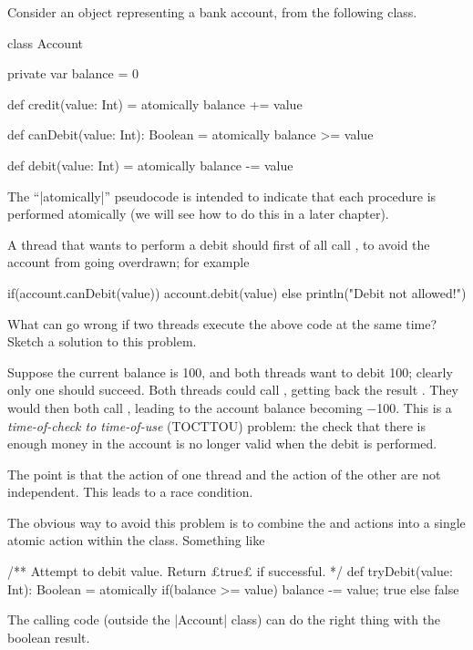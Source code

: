 \begin{questionS}
\label{exercise:account}
Consider an object representing a bank account, from the following class.
%
\begin{scala}
class Account{
  private var balance = 0

  def credit(value: Int) = atomically{ balance += value }

  def canDebit(value: Int): Boolean = atomically{ balance >= value }

  def debit(value: Int) = atomically{ balance -= value }
}
\end{scala}
%
The ``|atomically|'' pseudocode is intended to indicate that each
procedure is performed atomically (we will see how to do this in a
later chapter).

A thread that wants to perform a debit should first of all call
, to avoid the account from going overdrawn; for example
%
\begin{scala}[showstringspaces=false]
  if(account.canDebit(value)) account.debit(value)
  else println("Debit not allowed!")
\end{scala}

What can go wrong if two threads execute the above code at the same
time?  Sketch a solution to this problem.
\end{questionS}


\begin{answerS}
Suppose the current balance is 100, and both threads want to debit 100;
clearly only one should succeed.  Both threads could call
, getting back the result .  They would then
both call , leading to the account balance becoming $-$100.
This is a \emph{time-of-check to time-of-use} (TOCTTOU) problem: the check
that there is enough money in the account is no longer valid when the debit is
performed.

The point is that the  action of one thread and the
 action of the other are not independent.  This leads to a race
condition.

The obvious way to avoid this problem is to combine the  and
 actions into a single atomic action within the 
class.  Something like
%
\begin{scala}
  /** Attempt to debit value.  Return £true£ if successful. */
  def tryDebit(value: Int): Boolean = atomically{
    if(balance >= value){ balance -= value; true } else false
  }
\end{scala}
% 
The calling code (outside the |Account| class) can do the right thing with the
boolean result. 
\end{answerS}

